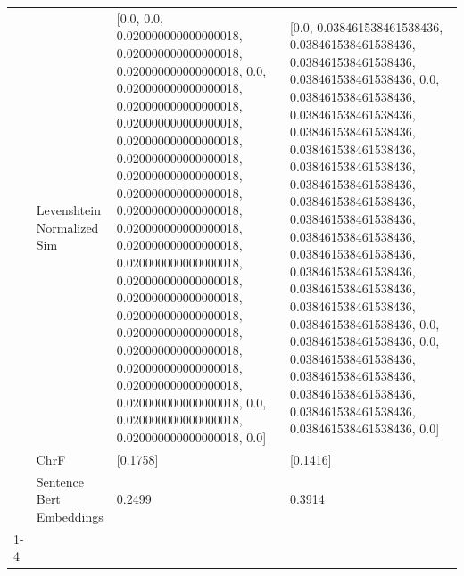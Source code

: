 \begin{tabular}{llll}
 & Levenshtein Normalized Sim & [0.0, 0.0, 0.020000000000000018, 0.020000000000000018, 0.020000000000000018, 0.0, 0.020000000000000018, 0.020000000000000018, 0.020000000000000018, 0.020000000000000018, 0.020000000000000018, 0.020000000000000018, 0.020000000000000018, 0.020000000000000018, 0.020000000000000018, 0.020000000000000018, 0.020000000000000018, 0.020000000000000018, 0.020000000000000018, 0.020000000000000018, 0.020000000000000018, 0.020000000000000018, 0.020000000000000018, 0.020000000000000018, 0.020000000000000018, 0.0, 0.020000000000000018, 0.020000000000000018, 0.0] & [0.0, 0.038461538461538436, 0.038461538461538436, 0.038461538461538436, 0.038461538461538436, 0.0, 0.038461538461538436, 0.038461538461538436, 0.038461538461538436, 0.038461538461538436, 0.038461538461538436, 0.038461538461538436, 0.038461538461538436, 0.038461538461538436, 0.038461538461538436, 0.038461538461538436, 0.038461538461538436, 0.038461538461538436, 0.038461538461538436, 0.038461538461538436, 0.0, 0.038461538461538436, 0.0, 0.038461538461538436, 0.038461538461538436, 0.038461538461538436, 0.038461538461538436, 0.038461538461538436, 0.0] \\
 & ChrF & [0.1758] & [0.1416] \\
 & Sentence Bert Embeddings & 0.2499 & 0.3914 \\
\cline{1-4}
\bottomrule
\end{tabular}
